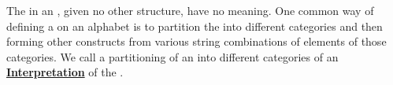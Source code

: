 \newcommand{\Interpretation}[0]{\textbf{\hyperref[rmk:Grammar]{Interpretation}}\xspace}
\newcommand{\Interpretations}[0]{\textbf{\hyperref[rmk:Grammar]{Interpretations}}\xspace}
\begin{rmk}[\Grammar]
\label{rmk:Grammar}

\rm
    The \Symbols in an \Alphabet, given no other structure, 
    have no meaning. 
    One common way of defining a \Grammar on an alphabet is to 
    partition the \Alphabet into different categories and
    then forming other constructs from various string combinations
    of elements of those categories. 
    We call a partitioning of an \Alphabet into different categories of \Symbols
    an \Interpretation of the \Alphabet.
\end{rmk}

